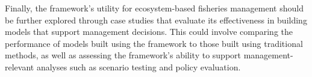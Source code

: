 Finally, the framework's utility for ecosystem-based fisheries management should be further explored through case studies that evaluate its effectiveness in building models that support management decisions. This could involve comparing the performance of models built using the framework to those built using traditional methods, as well as assessing the framework's ability to support management-relevant analyses such as scenario testing and policy evaluation.



